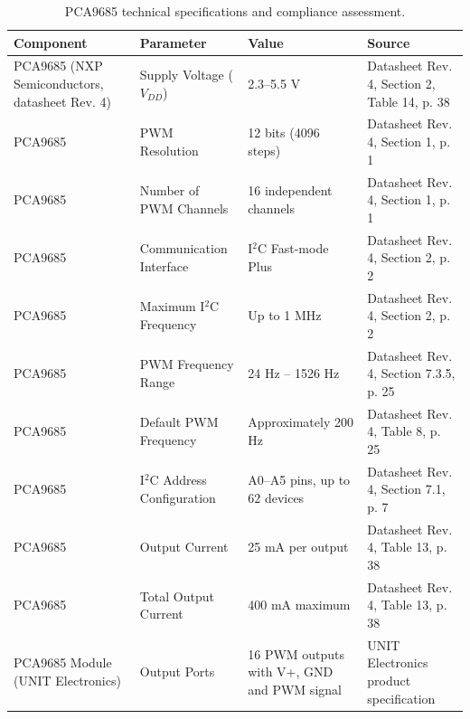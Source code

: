 \documentclass[lettersize,journal]{IEEEtran}
\begin{document}
\begin{table}[ht]
	\centering
	\caption{PCA9685 technical specifications and compliance assessment.}
	\label{tab:PCA9685}
	\scriptsize
	\renewcommand{\arraystretch}{1.2}
	\begin{tabular}{|p{1.4cm}|p{1.8cm}|p{1.8cm}|p{1.8cm}|}
		\hline
		\textbf{Component} &
		\textbf{Parameter} &
		\textbf{Value} &
		\textbf{Source}\\
		\hline
		
		PCA9685 (NXP Semiconductors, datasheet Rev. 4) &
		Supply Voltage ($V_{DD}$) &
		2.3--5.5 V &
		Datasheet Rev. 4, Section 2, Table 14, p. 38 \\
		\hline
		
		PCA9685 &
		PWM Resolution &
		12 bits (4096 steps) &
		Datasheet Rev. 4, Section 1, p. 1 \\
		\hline
		
		PCA9685 &
		Number of PWM Channels &
		16 independent channels &
		Datasheet Rev. 4, Section 1, p. 1 \\
		\hline
		
		PCA9685 &
		Communication Interface &
		I$^2$C Fast-mode Plus &
		Datasheet Rev. 4, Section 2, p. 2 \\
		\hline
		
		PCA9685 &
		Maximum I$^2$C Frequency &
		Up to 1 MHz &
		Datasheet Rev. 4, Section 2, p. 2 \\
		\hline
		
		PCA9685 &
		PWM Frequency Range &
		24 Hz -- 1526 Hz &
		Datasheet Rev. 4, Section 7.3.5, p. 25 \\
		\hline
		
		PCA9685 &
		Default PWM Frequency &
		Approximately 200 Hz &
		Datasheet Rev. 4, Table 8, p. 25 \\
		\hline
		
		PCA9685 &
		I$^2$C Address Configuration &
		A0--A5 pins, up to 62 devices &
		Datasheet Rev. 4, Section 7.1, p. 7 \\
		\hline
		
		PCA9685 &
		Output Current &
		25 mA per output &
		Datasheet Rev. 4, Table 13, p. 38 \\
		\hline
		
		PCA9685 &
		Total Output Current &
		400 mA maximum &
		Datasheet Rev. 4, Table 13, p. 38 \\
		\hline
		
		PCA9685 Module (UNIT Electronics) &
		Output Ports &
		16 PWM outputs with V+, GND and PWM signal &
		UNIT Electronics product specification \\
		\hline
		

\end{tabular}
\end{table}
\end{document}
